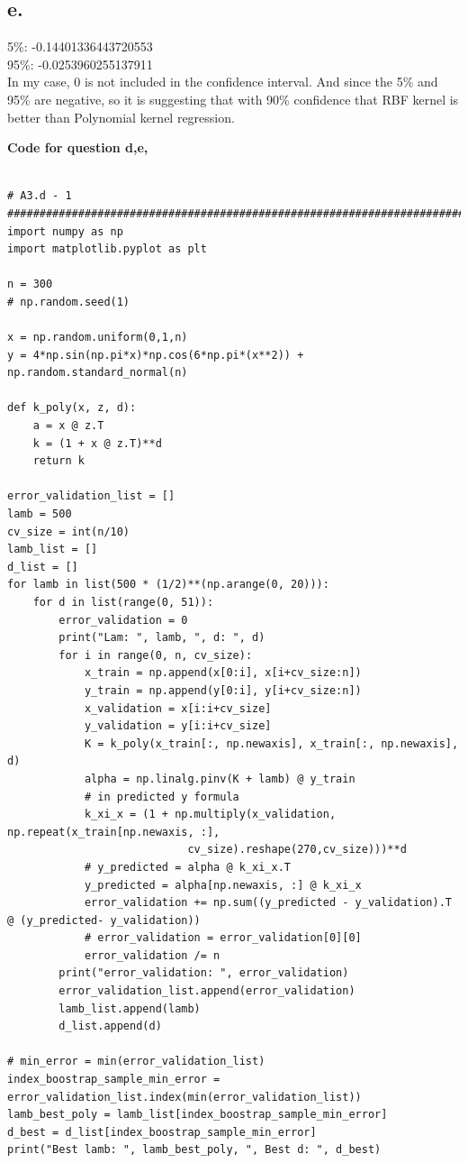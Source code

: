 \documentclass{article}
\begin{document}
\subsection*{e.}

5\%:  -0.14401336443720553 \\
95\%:  -0.0253960255137911 \\
In my case, 0 is not included in the confidence interval. And since the 5\% and 95\% are negative, so it is suggesting that with 90\% confidence that RBF kernel is better than Polynomial kernel regression.

\textbf{Code for question d,e, } 
\begin{verbatim}

# A3.d - 1 #################################################################################
import numpy as np
import matplotlib.pyplot as plt

n = 300
# np.random.seed(1)

x = np.random.uniform(0,1,n)
y = 4*np.sin(np.pi*x)*np.cos(6*np.pi*(x**2)) + np.random.standard_normal(n)

def k_poly(x, z, d):
	a = x @ z.T
	k = (1 + x @ z.T)**d
	return k

error_validation_list = []
lamb = 500
cv_size = int(n/10)
lamb_list = []
d_list = []
for lamb in list(500 * (1/2)**(np.arange(0, 20))):
	for d in list(range(0, 51)):
		error_validation = 0
		print("Lam: ", lamb, ", d: ", d)
		for i in range(0, n, cv_size):
			x_train = np.append(x[0:i], x[i+cv_size:n])
			y_train = np.append(y[0:i], y[i+cv_size:n])
			x_validation = x[i:i+cv_size]
			y_validation = y[i:i+cv_size]
			K = k_poly(x_train[:, np.newaxis], x_train[:, np.newaxis], d)
			alpha = np.linalg.pinv(K + lamb) @ y_train
			# in predicted y formula
			k_xi_x = (1 + np.multiply(x_validation, np.repeat(x_train[np.newaxis, :], 
							cv_size).reshape(270,cv_size)))**d
			# y_predicted = alpha @ k_xi_x.T
			y_predicted = alpha[np.newaxis, :] @ k_xi_x
			error_validation += np.sum((y_predicted - y_validation).T @ (y_predicted- y_validation))
			# error_validation = error_validation[0][0]
			error_validation /= n
		print("error_validation: ", error_validation)
		error_validation_list.append(error_validation)
		lamb_list.append(lamb)
		d_list.append(d)

# min_error = min(error_validation_list)
index_boostrap_sample_min_error = error_validation_list.index(min(error_validation_list))
lamb_best_poly = lamb_list[index_boostrap_sample_min_error]
d_best = d_list[index_boostrap_sample_min_error]
print("Best lamb: ", lamb_best_poly, ", Best d: ", d_best)


\end{verbatim}
\end{document}
